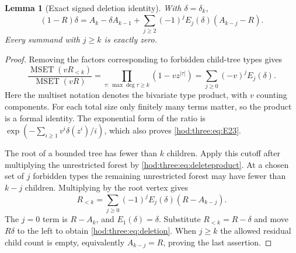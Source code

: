 \documentclass[11pt,letterpaper]{article}
\newtheorem{lemma}[theorem]{Lemma}
\theoremstyle{definition}\newtheorem{definition}[theorem]{Definition}
\theoremstyle{remark}\newtheorem{remark}[theorem]{Remark}
\newcommand{\MSET}{\operatorname{MSET}}
\begin{document}
\begin{lemma}[Exact signed deletion identity]\label{hod:three:lem:delete}
With $\delta=\delta_k$,
\begin{equation}\label{hod:three:eq:deletion}
(1-R)\delta=A_k-\delta A_{k-1}
+\sum_{j\ge2}(-1)^jE_j(\delta)(A_{k-j}-R).
\end{equation}
Every summand with $j\ge k$ is exactly zero.
\end{lemma}
\begin{proof}
Removing the factors corresponding to forbidden child-tree types gives
\begin{equation}\label{hod:three:eq:deleteproduct}
\frac{\MSET(vR_{<k})}{\MSET(vR)}
=\prod_{\tau:\,\max\deg\tau\ge k}(1-vz^{|\tau|})
=\sum_{j\ge0}(-v)^jE_j(\delta).
\end{equation}
Here the multiset notation denotes the bivariate type product, with $v$ counting components. For each total size only finitely many terms matter, so the product is a formal identity. The exponential form of the ratio is
$\exp(-\sum_{i\ge1}v^i\delta(z^i)/i)$, which also proves \eqref{hod:three:eq:E23}.

The root of a bounded tree has fewer than $k$ children. Apply this cutoff after multiplying the unrestricted forest by \eqref{hod:three:eq:deleteproduct}. At a chosen set of $j$ forbidden types the remaining unrestricted forest may have fewer than $k-j$ children. Multiplying by the root vertex gives
\[
R_{<k}=\sum_{j\ge0}(-1)^jE_j(\delta)(R-A_{k-j}).
\]
The $j=0$ term is $R-A_k$, and $E_1(\delta)=\delta$. Substitute $R_{<k}=R-\delta$ and move $R\delta$ to the left to obtain \eqref{hod:three:eq:deletion}. When $j\ge k$ the allowed residual child count is empty, equivalently $A_{k-j}=R$, proving the last assertion.
\end{proof}
\end{document}
